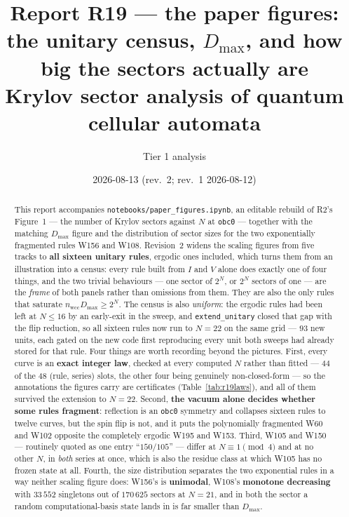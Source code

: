 \documentclass[11pt]{article}
\title{\textbf{Report R19 --- the paper figures: the unitary census, $D_{\max}$,
and how big the sectors actually are}\\
\large Krylov sector analysis of quantum cellular automata}
\author{Tier 1 analysis}
\date{2026-08-13 (rev.~2; rev.~1 2026-08-12)}
\newcommand{\rt}[1]{\texttt{#1}}
\newcommand{\fn}[1]{\texttt{#1}}
\newcommand{\wcc}{\mathrm{wcc}}
\begin{document}
\maketitle

\begin{abstract}
This report accompanies \fn{notebooks/paper\_figures.ipynb}, an editable rebuild
of R2's Figure~1 --- the number of Krylov sectors against $N$ at \rt{obc0} ---
together with the matching $D_{\max}$ figure and the distribution of sector sizes
for the two exponentially fragmented rules W156 and W108. Revision~2 widens the
scaling figures from five tracks to \textbf{all sixteen unitary rules}, ergodic
ones included, which turns them from an illustration into a census: every rule
built from $I$ and $V$ alone does exactly one of four things, and the two trivial
behaviours --- one sector of $2^N$, or $2^N$ sectors of one --- are the
\emph{frame} of both panels rather than omissions from them. They are also the
only rules that saturate $n_\wcc D_{\max} \ge 2^N$. The census is also
\emph{uniform}: the ergodic rules had been left at $N \le 16$ by an early-exit in
the sweep, and \fn{extend\_unitary} closed that gap with the flip reduction, so
all sixteen rules now run to $N = 22$ on the same grid --- $93$ new units, each
gated on the new code first reproducing every unit both sweeps had already
stored for that rule. Four things are worth recording beyond the pictures.
First, every curve is an \textbf{exact integer law}, checked at every computed
$N$ rather than fitted --- $44$ of the $48$ (rule, series) slots, the other four
being genuinely non-closed-form --- so the annotations the figures carry are
certificates (Table~\ref{tab:r19laws}), and all of them survived the extension
to $N=22$.
Second, \textbf{the vacuum alone decides whether some rules fragment}: reflection
is an \rt{obc0} symmetry and collapses sixteen rules to twelve curves, but the
spin flip is not, and it puts the polynomially fragmented W60 and W102 opposite
the completely ergodic W195 and W153. Third, W105 and W150 --- routinely quoted
as one entry ``$150/105$'' --- differ at $N\equiv1\pmod 4$ and at no other $N$,
in \emph{both} series at once, which is also the residue class at which W105 has
no frozen state at all. Fourth, the size distribution separates the two
exponential rules in a way neither scaling figure does: W156's is
\textbf{unimodal}, W108's \textbf{monotone decreasing} with $33\,552$ singletons
out of $170\,625$ sectors at $N=21$, and in both the sector a random
computational-basis state lands in is far smaller than $D_{\max}$.
\end{abstract}
\end{document}
